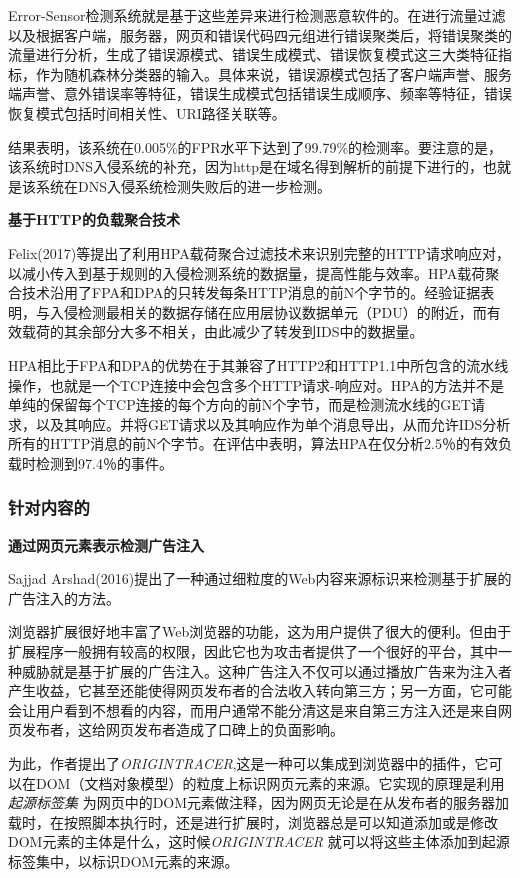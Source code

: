 \documentclass[12pt]{article} %
\begin{document}
Error-Sensor检测系统就是基于这些差异来进行检测恶意软件的。在进行流量过滤以及根据客户端，服务器，网页和错误代码四元组进行错误聚类后，将错误聚类的流量进行分析，生成了错误源模式、错误生成模式、错误恢复模式这三大类特征指标，作为随机森林分类器的输入。具体来说，错误源模式包括了客户端声誉、服务端声誉、意外错误率等特征，错误生成模式包括错误生成顺序、频率等特征，错误恢复模式包括时间相关性、URI路径关联等。

结果表明，该系统在0.005\%的FPR水平下达到了99.79\%的检测率。要注意的是，该系统时DNS入侵系统的补充，因为http是在域名得到解析的前提下进行的，也就是该系统在DNS入侵系统检测失败后的进一步检测。

\textbf{基于HTTP的负载聚合技术}

Felix(2017)\cite{Felix}等提出了利用HPA载荷聚合过滤技术来识别完整的HTTP请求响应对，以减小传入到基于规则的入侵检测系统的数据量，提高性能与效率。HPA载荷聚合技术沿用了FPA和DPA的只转发每条HTTP消息的前N个字节的。经验证据表明，与入侵检测最相关的数据存储在应用层协议数据单元（PDU）的附近，而有效载荷的其余部分大多不相关，由此减少了转发到IDS中的数据量。

HPA相比于FPA和DPA的优势在于其兼容了HTTP2和HTTP1.1中所包含的流水线操作，也就是一个TCP连接中会包含多个HTTP请求-响应对。HPA的方法并不是单纯的保留每个TCP连接的每个方向的前N个字节，而是检测流水线的GET请求，以及其响应。并将GET请求以及其响应作为单个消息导出，从而允许IDS分析所有的HTTP消息的前N个字节。在评估中表明，算法HPA在仅分析2.5％的有效负载时检测到97.4％的事件。

\subsubsection{针对内容的}
\label{content}

\textbf{通过网页元素表示检测广告注入}

Sajjad Arshad(2016)\cite{Arshad}提出了一种通过细粒度的Web内容来源标识来检测基于扩展的广告注入的方法。

浏览器扩展很好地丰富了Web浏览器的功能，这为用户提供了很大的便利。但由于扩展程序一般拥有较高的权限，因此它也为攻击者提供了一个很好的平台，其中一种威胁就是基于扩展的广告注入。这种广告注入不仅可以通过播放广告来为注入者产生收益，它甚至还能使得网页发布者的合法收入转向第三方；另一方面，它可能会让用户看到不想看的内容，而用户通常不能分清这是来自第三方注入还是来自网页发布者，这给网页发布者造成了口碑上的负面影响。

为此，作者提出了\textit{ORIGINTRACER},这是一种可以集成到浏览器中的插件，它可以在DOM（文档对象模型）的粒度上标识网页元素的来源。它实现的原理是利用 \textit{起源标签集} 为网页中的DOM元素做注释，因为网页无论是在从发布者的服务器加载时，在按照脚本执行时，还是进行扩展时，浏览器总是可以知道添加或是修改DOM元素的主体是什么，这时候\textit{ORIGINTRACER} 就可以将这些主体添加到起源标签集中，以标识DOM元素的来源。
\end{document}
